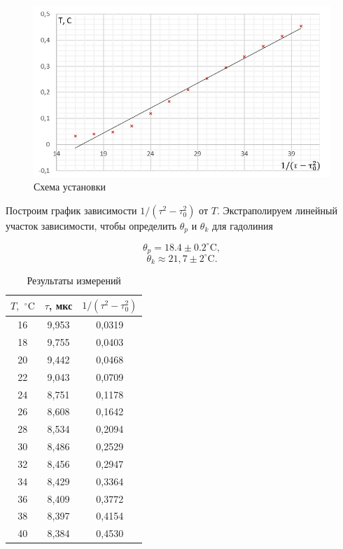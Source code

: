 \documentclass[a4paper]{article}
\theoremstyle{definition}
\theoremstyle{remark}
\begin{document}
\begin{figure}[h!]
    \centering
    \includegraphics[width=\linewidth]{image/pic1.jpg}
    \caption{Схема установки}
\end{figure}

Построим график зависимости $1 / (\tau^2 - \tau_0^2)$ от $T$. Экстраполируем линейный участок зависимости, чтобы определить $\theta_p$ и $\theta_k$ для гадолиния

    $$\theta_p = 18.4 \pm  0.2^{\circ} \mathrm{C},$$
    $$\theta_k \approx 21,7 \pm 2^{\circ} \mathrm{C}.$$

\begin{table}[h!]
    \centering
    \caption{Результаты измерений}
    \begin{tabular}{|c|c|c|}
    \hline
    $T,$ $^\circ \mathrm{C}$ & $\tau$, мкс & $1/(\tau^2 - \tau_0^2)$ \\ \hline
    16             & 9,953       & 0,0319                  \\ \hline
    18             & 9,755       & 0,0403                  \\ \hline
    20             & 9,442       & 0,0468                  \\ \hline
    22             & 9,043       & 0,0709                  \\ \hline
    24             & 8,751       & 0,1178                  \\ \hline
    26             & 8,608       & 0,1642                  \\ \hline
    28             & 8,534       & 0,2094                  \\ \hline
    30             & 8,486       & 0,2529                  \\ \hline
    32             & 8,456       & 0,2947                  \\ \hline
    34             & 8,429       & 0,3364                  \\ \hline
    36             & 8,409       & 0,3772                  \\ \hline
    38             & 8,397       & 0,4154                  \\ \hline
    40             & 8,384       & 0,4530                  \\ \hline
    \end{tabular}
    \end{table}
\end{document}
